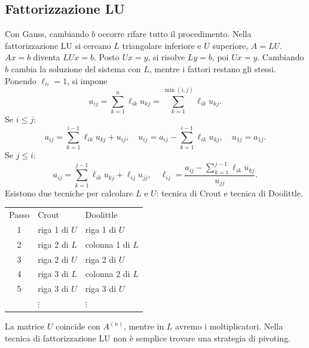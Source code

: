 \documentclass[11pt,a4paper]{article}
\newcommand{\pagina}[1]{\clearpage}
\begin{document}
\subsection*{Fattorizzazione LU}
Con Gauss, cambiando $b$ occorre rifare tutto il procedimento. Nella fattorizzazione LU si cercano $L$ triangolare inferiore e $U$ superiore, $A=LU$.
\pagina{25}
$Ax=b$ diventa $LUx=b$. Posto $Ux=y$, si risolve $Ly=b$, poi $Ux=y$. Cambiando $b$ cambia la soluzione del sistema con $L$, mentre i fattori restano gli stessi.
Ponendo $\ell_{ii}=1$, si impone
\[a_{ij}=\sum_{k=1}^n\ell_{ik}u_{kj}=\sum_{k=1}^{\min(i,j)}\ell_{ik}u_{kj}.\]
Se $i\le j$:
\[a_{ij}=\sum_{k=1}^{i-1}\ell_{ik}u_{kj}+u_{ij},\quad u_{ij}=a_{ij}-\sum_{k=1}^{i-1}\ell_{ik}u_{kj},\quad u_{1j}=a_{1j}.\]
Se $j\le i$:
\[a_{ij}=\sum_{k=1}^{j-1}\ell_{ik}u_{kj}+\ell_{ij}u_{jj},\quad\ell_{ij}=\frac{a_{ij}-\sum_{k=1}^{j-1}\ell_{ik}u_{kj}}{u_{jj}}.\]
Esistono due tecniche per calcolare $L$ e $U$: tecnica di Crout e tecnica di Doolittle.
\begin{center}\end{center}
\pagina{26}
\begin{center}\begin{tabular}{c|l|l}Passo&Crout&Doolittle\\1&riga 1 di $U$&riga 1 di $U$\\2&riga 2 di $L$&colonna 1 di $L$\\3&riga 2 di $U$&riga 2 di $U$\\4&riga 3 di $L$&colonna 2 di $L$\\5&riga 3 di $U$&riga 3 di $U$\\&$\vdots$&$\vdots$\end{tabular}\end{center}
La matrice $U$ coincide con $A^{(n)}$, mentre in $L$ avremo i moltiplicatori. Nella tecnica di fattorizzazione LU non è semplice trovare una strategia di pivoting.
\end{document}
